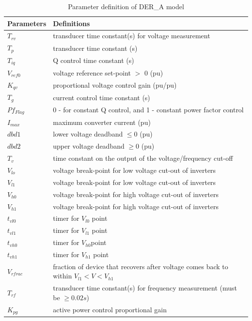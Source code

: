 \documentclass[journal]{IEEEtran}
\begin{document}
	\begin{table}
		\caption{Parameter definition of DER\_A model \cite{EPRI2019}}
		\label{table1}
		\setlength{\tabcolsep}{8pt}
		\begin{tabular}{|p{30pt}|p{185pt}|}
			\hline
			Parameters& 
			\centerline{Definitions} \\
			\hline
			$T_{rv}$& 
			transducer time constant(s) for voltage measurement\\
			$T_p$& 
			transducer time constant (s) \\
			$T_{iq}$& 
			Q control time constant (s)\\
			$V_{ref0}$& 
			voltage reference set-point $>$ 0 (pu)\\
			$K_{qv}$& 
			proportional voltage control gain (pu/pu)\\
			$T_g$& 
			current control time constant (s)\\
			$Pf_{Flag}$& 
			0 - for constant Q control, and 1 - constant power factor control\\
			$I_{max}$& 
			maximum converter current (pu)\\
			$dbd1$& 
			lower voltage deadband $\leqslant 0$ (pu)\\
			$dbd2$& 
			upper voltage deadband $\geqslant 0$ (pu)\\
			$T_{v}$& 
			time constant on the output of the voltage/frequency cut-off\\
			$V_{lo}$& 
			voltage break-point for low voltage cut-out of inverters\\
			$V_{l1}$& 
			voltage break-point for low voltage cut-out of inverters\\
			$V_{h0}$& 
			voltage break-point for high voltage cut-out of inverters\\
			$V_{h1}$& 
			voltage break-point for high voltage cut-out of inverters\\
			$t_{vl0}$& 
			timer for $V_{l0}$ point\\
			$t_{vl1}$& 
			timer for $V_{l1}$ point\\
			$t_{vh0}$& 
			timer for $V_{h0} $point\\
			$t_{vh1}$& 
			timer for $ V_{h1}$ point\\
			$V_{rfrac}$& 
			fraction of device that recovers after voltage comes back to within $V_{l1} < V < V_{h1}$\\
			$T_{rf}$& 
			transducer time constant(s) for frequency measurement (must be $\geqslant 0.02 s$) \\
			$K_{pg}$& 
			active power control proportional gain\\

\end{tabular}
\end{table}
\end{document}

